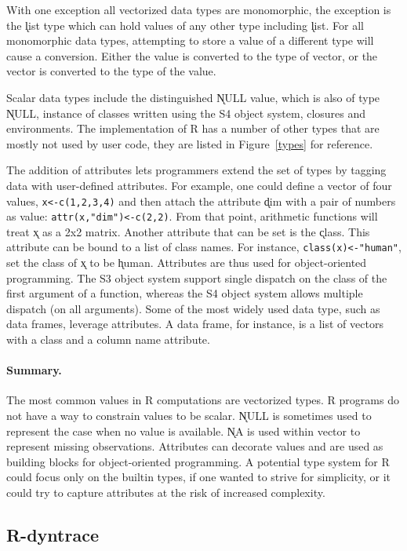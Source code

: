 \documentclass[acmsmall,review,anonymous]{acmart}\settopmatter{printfolios=true,printccs=false,printacmref=false}
\newcommand{\code}[1]{{\lstinline[style=Rin]!#1!}\xspace}
\begin{document}
With one exception all vectorized data types are monomorphic, the exception
is the \k{list} type which can hold values of any other type including
\k{list}. For all monomorphic data types, attempting to store a value of a
different type will cause a conversion. Either the value is converted to the
type of vector, or the vector is converted to the type of the value.

Scalar data types include the distinguished \k{NULL} value, which is also of
type \k{NULL}, instance of classes written using the S4 object system,
closures and environments.  The implementation of R has a number of other
types that are mostly not used by user code, they are listed in
Figure~\ref{types} for reference.

The addition of attributes lets programmers extend the set of types by
tagging data with user-defined attributes. For example, one could define a
vector of four values, \code{x<-c(1,2,3,4)} and then attach the attribute
\k{dim} with a pair of numbers as value: \code{attr(x,"dim")<-c(2,2)}.  From
that point, arithmetic functions will treat \k{x} as a 2x2 matrix. Another
attribute that can be set is the \k{class}.  This attribute can be bound to
a list of class names. For instance, \code{class(x)<-"human"}, set the class
of \k{x} to be \k{human}.  Attributes are thus used for object-oriented
programming. The S3 object system support single dispatch on the class of
the first argument of a function, whereas the S4 object system allows
multiple dispatch (on all arguments). Some of the most widely used data
type, such as data frames, leverage attributes. A data frame, for instance,
is a list of vectors with a class and a column name attribute.

\paragraph{Summary.} The most common values in R computations are vectorized
types. R programs do not have a way to constrain values to be scalar.
\k{NULL} is sometimes used to represent the case when no value is
available. \k{NA} is used within vector to represent missing observations.
Attributes can decorate values and are used as building blocks for
object-oriented programming. A potential type system for R could focus only
on the builtin types, if one wanted to strive for simplicity, or it could
try to capture attributes at the risk of increased complexity.

%
%
%
%
\subsection{R-dyntrace}
\label{sec:r-dyntrace}
\end{document}
